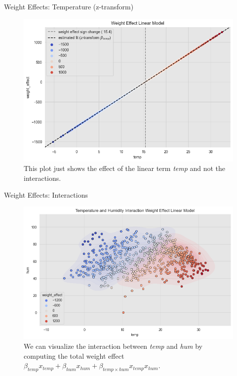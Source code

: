 \documentclass[10pt]{beamer}
\begin{document}
\begin{frame}{Weight Effects: Temperature (z-transform)}
\begin{center}
  \begin{figure}
    \includegraphics[scale=0.48]{images/interpretable_ml_65_0.png}
    \caption{This plot just shows the effect of the linear term {\em temp} and not the interactions.}
  \end{figure}
\end{center}
\end{frame}

\begin{frame}{Weight Effects: Interactions}
\begin{center}
  \begin{figure}
    \includegraphics[scale=0.48]{images/interpretable_ml_68_0.png}
    \caption{
      We can visualize the interaction between {\em temp} and {\em hum} by computing the total weight effect $\beta_{temp}x_{temp} + \beta_{hum}x_{hum} + \beta_{temp \times hum}x_{temp}x_{hum}$.
    }
  \end{figure}
\end{center}
\end{frame}
\end{document}

